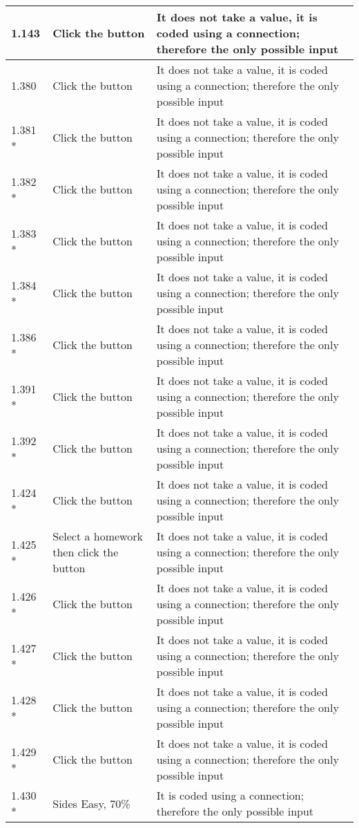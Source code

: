 \begin{landscape}
\begin{center}
\begin{longtable}{|p{4cm}|p{4cm}|p{5cm}|}
1.143 & Click the button & It does not take a value, it is coded using a connection; therefore the only possible input \\ \hline
1.380 & Click the button & It does not take a value, it is coded using a connection; therefore the only possible input \\ \hline
1.381 * & Click the button & It does not take a value, it is coded using a connection; therefore the only possible input \\ \hline
1.382 * & Click the button & It does not take a value, it is coded using a connection; therefore the only possible input \\ \hline
1.383 * & Click the button & It does not take a value, it is coded using a connection; therefore the only possible input \\ \hline
1.384 * & Click the button & It does not take a value, it is coded using a connection; therefore the only possible input \\ \hline
1.386 * & Click the button & It does not take a value, it is coded using a connection; therefore the only possible input \\ \hline
1.391 * & Click the button & It does not take a value, it is coded using a connection; therefore the only possible input \\ \hline
1.392 * & Click the button & It does not take a value, it is coded using a connection; therefore the only possible input \\ \hline
1.424 * & Click the button & It does not take a value, it is coded using a connection; therefore the only possible input \\ \hline
1.425 * & Select a homework then click the button & It does not take a value, it is coded using a connection; therefore the only possible input \\ \hline
1.426 * & Click the button & It does not take a value, it is coded using a connection; therefore the only possible input \\ \hline
1.427 * & Click the button & It does not take a value, it is coded using a connection; therefore the only possible input \\ \hline
1.428 * & Click the button & It does not take a value, it is coded using a connection; therefore the only possible input \\ \hline
1.429 * & Click the button & It does not take a value, it is coded using a connection; therefore the only possible input \\ \hline
1.430 * & Sides Easy, 70\% & It is coded using a connection; therefore the only possible input \\ \hline

\end{longtable}
\end{center}
\end{landscape}
